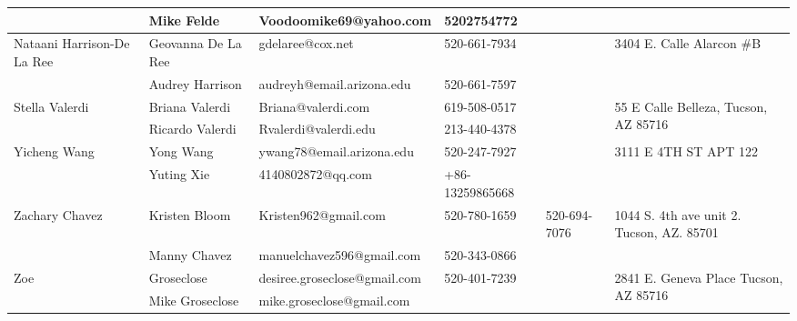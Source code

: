 \documentclass[landscape]{article}\usepackage[]{graphicx}\usepackage[]{color}
\begin{document}
\begin{longtable}{|p{100pt}|p{100pt}|p{140pt}|p{60pt}|p{64pt}|p{120pt}|}
 & Mike Felde & Voodoomike69@yahoo.com & 5202754772 &  & \\
\hline
\multirow{2}{100pt}{Nataani Harrison-De La Ree} & Geovanna De La Ree & gdelaree@cox.net & 520-661-7934 &  & \multirow{2}{120pt}{3404 E. Calle Alarcon \#B} \\
 & Audrey Harrison & audreyh@email.arizona.edu & 520-661-7597 &  & \\
\hline
\multirow{2}{100pt}{Stella Valerdi} & Briana Valerdi & Briana@valerdi.com & 619-508-0517 &  & \multirow{2}{120pt}{55 E Calle Belleza, Tucson, AZ 85716} \\
 & Ricardo Valerdi & Rvalerdi@valerdi.edu & 213-440-4378 &  & \\
\hline
\multirow{2}{100pt}{Yicheng Wang} & Yong Wang & ywang78@email.arizona.edu & 520-247-7927 &  & \multirow{2}{120pt}{3111 E 4TH ST APT 122} \\
 & Yuting Xie & 4140802872@qq.com & +86-13259865668 &  & \\
\hline
\multirow{2}{100pt}{Zachary Chavez} & Kristen Bloom & Kristen962@gmail.com & 520-780-1659 & 520-694-7076 & \multirow{2}{120pt}{1044 S. 4th ave unit 2. Tucson, AZ. 85701} \\
 & Manny Chavez & manuelchavez596@gmail.com & 520-343-0866 &  & \\
\hline
\multirow{2}{100pt}{Zoe} & Groseclose & desiree.groseclose@gmail.com & 520-401-7239 &  & \multirow{2}{120pt}{2841 E. Geneva Place Tucson, AZ 85716} \\
 & Mike Groseclose & mike.groseclose@gmail.com &  &  & \\
\hline
\end{longtable}
\newpage
\end{document}
